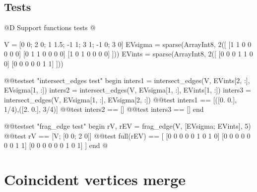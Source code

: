 \documentclass[10pt,oneside]{article}
\begin{document}
\subsection{Tests}
@D Support functions tests
@{V = [0 0; 2 0; 1 1.5; -1 1; 3 1; -1 0; 3 0]
EVsigma = sparse(Array{Int8, 2}([
    [1 1 0 0 0 0 0]
    [0 1 1 0 0 0 0]
    [1 0 1 0 0 0 0]
]))
EVints = sparse(Array{Int8, 2}([
    [0 0 0 1 1 0 0]
    [0 0 0 0 0 1 1]
]))

@@testset "intersect_edges test" begin
    inters1 = intersect_edges(V, EVints[2, :], EVsigma[1, :])
    inters2 = intersect_edges(V, EVsigma[1, :], EVints[1, :])
    inters3 = intersect_edges(V, EVsigma[1, :], EVsigma[2, :])
    @@test inters1 == [([0. 0.], 1/4),([2. 0.], 3/4)]
    @@test inters2 == []
    @@test inters3 == []
end

@@testset "frag_edge test" begin
    rV, rEV = frag_edge(V, [EVsigma; EVints], 5)
    @@test rV == [V; [0 0; 2 0]]
    @@test full(rEV) == [
        [0 0 0 0 0 1 0 1 0]
        [0 0 0 0 0 0 0 1 1]
        [0 0 0 0 0 0 1 0 1]
    ]
end
@}






\section{Coincident vertices merge}
\end{document}
